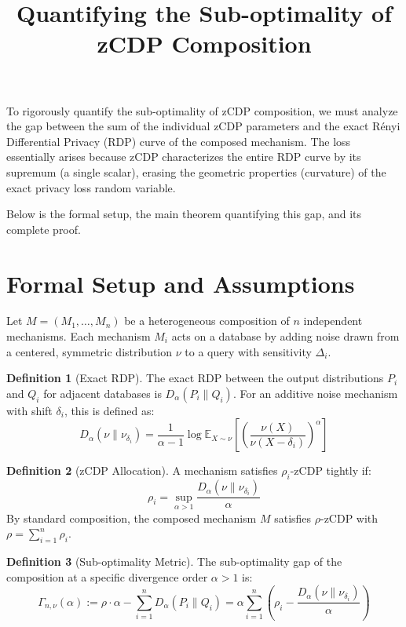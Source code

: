 \documentclass[11pt]{article}
\title{Quantifying the Sub-optimality of zCDP Composition}
\author{}
\date{}
\theoremstyle{definition}
\newtheorem{definition}{Definition}
\begin{document}
\maketitle

To rigorously quantify the sub-optimality of zCDP composition, we must analyze the gap between the sum of the individual zCDP parameters and the exact R\'enyi Differential Privacy (RDP) curve of the composed mechanism. The loss essentially arises because zCDP characterizes the entire RDP curve by its supremum (a single scalar), erasing the geometric properties (curvature) of the exact privacy loss random variable.

Below is the formal setup, the main theorem quantifying this gap, and its complete proof.

\section{Formal Setup and Assumptions}

Let $M = (M_1, \dots, M_n)$ be a heterogeneous composition of $n$ independent mechanisms. Each mechanism $M_i$ acts on a database by adding noise drawn from a centered, symmetric distribution $\nu$ to a query with sensitivity $\Delta_i$.

\begin{definition}[Exact RDP]
The exact RDP between the output distributions $P_i$ and $Q_i$ for adjacent databases is $D_\alpha(P_i\|Q_i)$. For an additive noise mechanism with shift $\delta_i$, this is defined as:
\[
D_\alpha(\nu\|\nu_{\delta_i}) = \frac{1}{\alpha-1} \log \mathbb{E}_{X \sim \nu} \left[ \left( \frac{\nu(X)}{\nu(X-\delta_i)} \right)^\alpha \right]
\]
\end{definition}

\begin{definition}[zCDP Allocation]
A mechanism satisfies $\rho_i$-zCDP tightly if:
\[
\rho_i = \sup_{\alpha > 1} \frac{D_\alpha(\nu\|\nu_{\delta_i})}{\alpha}
\]
By standard composition, the composed mechanism $M$ satisfies $\rho$-zCDP with $\rho = \sum_{i=1}^n \rho_i$.
\end{definition}

\begin{definition}[Sub-optimality Metric]
The sub-optimality gap of the composition at a specific divergence order $\alpha > 1$ is:
\[
\Gamma_{n,\nu}(\alpha) := \rho \cdot \alpha - \sum_{i=1}^n D_\alpha(P_i\|Q_i) = \alpha \sum_{i=1}^n \left( \rho_i - \frac{D_\alpha(\nu\|\nu_{\delta_i})}{\alpha} \right)
\]
\end{definition}
\end{document}
